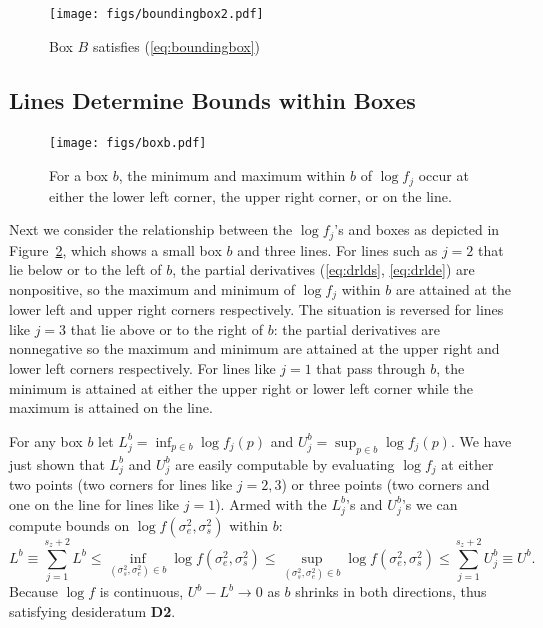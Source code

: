 \documentclass[ejs]{imsart}
\newcommand{\RL}{f}
\newcommand{\logRL}{\log\RL}
\newcommand{\sigssq}{\sigma_s^2}
\newcommand{\sigesq}{\sigma_e^2}
\newcommand{\logRLss}{\logRL(\sigesq,\sigssq)}
\begin{document}
\begin{figure}[h]
	\centering
	\texttt{[image: figs/boundingbox2.pdf]}
	\caption{Box $B$ satisfies (\ref{eq:boundingbox})}
	\label{fig:boundingbox2}
\end{figure}

\subsection{Lines Determine Bounds within Boxes}
\label{sec:boundsinboxes}
\begin{figure}
	\centering
	\texttt{[image: figs/boxb.pdf]}
	\caption{For a box $b$,  the minimum and
	maximum within $b$ of $\logRL_j$
	occur at either the lower left corner, the upper right  corner, or
	on the line.
}	\label{fig:boxb}
\end{figure}
Next we consider the relationship between the $\logRL_j$'s and boxes as depicted in Figure~\ref{fig:boxb}, which shows a small box $b$ and three lines.  For lines such as $j=2$ that lie below or to the left of $b$, the partial derivatives (\ref{eq:drlds}, \ref{eq:drlde}) are nonpositive, so the maximum and minimum of $\logRL_j$ within $b$ are attained at the lower left and upper right corners respectively.  The situation is reversed for lines like $j=3$ that lie above or to the right of $b$: the partial derivatives are nonnegative so the maximum and minimum are attained at the upper right and lower left corners respectively.  For lines like $j=1$ that pass through $b$, the minimum is attained at either the upper right or lower left corner while the maximum is attained on the line.

For any box $b$ let $L^b_j = \inf_{p\in b} \logRL_j(p)$ and $U^b_j = \sup_{p\in b} \logRL_j(p)$.  We have just shown that $L^b_j$ and $U^b_j$ are easily computable by evaluating $\logRL_j$ at either two points (two corners for lines like $j=2,3$) or three points (two corners and one on the line for lines like $j=1$).
Armed with the $L^b_j$'s and $U^b_j$'s we can compute bounds on $\logRLss$ within $b$:
\begin{equation}
\label{eq:bounds}
	L^b \equiv \sum_{j=1}^{s_z+2} L^b \le \inf_{(\sigssq,\sigesq)\in b} \logRLss \le
	\sup_{(\sigssq,\sigesq)\in b} \logRLss \le \sum_{j=1}^{s_z+2} U^b_j \equiv U^b.
\end{equation}
Because $\logRL$ is continuous, $U^b - L^b \rightarrow 0$ as $b$ shrinks in both directions, thus satisfying desideratum \textbf{D2}.
\end{document}
